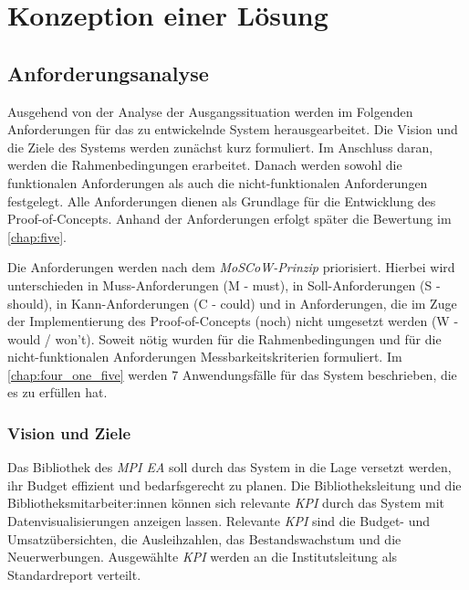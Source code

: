 \chapter{Konzeption einer Lösung}
\label{chap:four}

\section{Anforderungsanalyse}
Ausgehend von der Analyse der Ausgangssituation werden im Folgenden 
Anforderungen für das zu entwickelnde System herausgearbeitet. Die Vision und die Ziele des Systems werden zunächst kurz formuliert. Im Anschluss daran,
werden die Rahmenbedingungen erarbeitet. Danach werden sowohl die funktionalen Anforderungen als
auch die nicht-funktionalen Anforderungen festgelegt. Alle Anforderungen dienen als Grundlage für die Entwicklung des Proof-of-Concepts. 
Anhand der Anforderungen erfolgt später die Bewertung im \autoref{chap:five}.


Die Anforderungen werden nach dem \textit{MoSCoW-Prinzip} priorisiert. 
Hierbei wird unterschieden in Muss-Anforderungen (M - must), in Soll-Anforderungen (S - should), in Kann-Anforderungen (C - could) und in Anforderungen,
die im Zuge der Implementierung des Proof-of-Concepts (noch) nicht umgesetzt werden (W - would / won't).
Soweit nötig wurden für die Rahmenbedingungen und für die nicht-funktionalen Anforderungen Messbarkeitskriterien formuliert. 
Im \autoref{chap:four_one_five} werden 7 Anwendungsfälle für das System beschrieben, die es zu erfüllen hat.

\subsection{Vision und Ziele}
Das Bibliothek des \textit{\acrshort{MPI EA}} soll durch das System in die Lage versetzt werden, ihr Budget effizient und bedarfsgerecht zu planen.
Die Bibliotheksleitung und die Bibliotheksmitarbeiter:innen können sich relevante \textit{\acrlong{KPI}} durch das System mit
Datenvisualisierungen anzeigen lassen. Relevante \textit{\acrshort{KPI}} sind die Budget- und Umsatzübersichten, die Ausleihzahlen, das Bestandswachstum und die
Neuerwerbungen. 
Ausgewählte \textit{\acrshort{KPI}} werden an die Institutsleitung als Standardreport verteilt.

